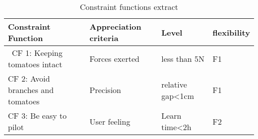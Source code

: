 \begin{table}[ht]
    \centering    
    \begin{tabular}{|p{3cm} | p{3cm} | p{3cm} | p{3cm} |} 
        \hline
        \textbf{Constraint Function} & \textbf{Appreciation criteria} & \textbf{Level} & \textbf{flexibility} \\ [0.5ex] 
        \hline\
        CF 1: Keeping tomatoes intact & Forces exerted & less than 5N & F1 \\ 
        \hline
        CF 2: Avoid branches and tomatoes & Precision & relative gap<1cm & F1 \\
        \hline
        CF 3: Be easy to pilot & User feeling & Learn time<2h & F2 \\
        \hline
    \end{tabular}
    \caption{Constraint functions extract}
\end{table}
